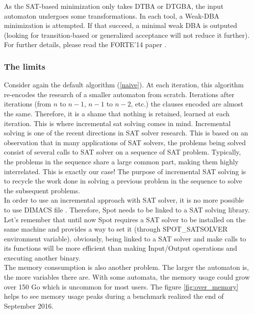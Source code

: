 \noindent As the SAT-based minimization only takes DTBA or DTGBA, the input automaton undergoes some
transformations. In each tool, a Weak-DBA minimization is attempted. If that succeed, a minimal weak DBA
is outputed (looking for transition-based or generalized acceptance will not reduce it further). For
further details, please read the FORTE'14 paper \cite{14}.

\subsubsection{The limits}
Consider again the default algorithm (\ref{naive}).
At each iteration, this algorithm re-encodes the research of a smaller automaton from scratch. Iterations
after iterations (from $n$ to $n-1$, $n-1$ to $n-2$, etc.) the clauses encoded are almost the same.
Therefore, it is a shame that nothing is retained, learned at each iteration. This is where incremental sat
solving comes in mind. Incremental solving is one of the recent directions in SAT solver research. This is
based on an observation that in many applications of SAT solvers, the problems being solved consist of
several calls to SAT solver on a sequence of SAT problem. Typically, the problems in the sequence share a
large common part, making them highly interrelated. This is exactly our case! The purpose of incremental
SAT solving is to recycle the work done in solving a previous problem in the sequence to solve the
subsequent problems.\\

In order to use an incremental approach with SAT solver, it is no more possible to use DIMACS file
\cite{18}. Therefore, Spot needs to be linked to a SAT solving library. Let's remember that until now
Spot requires a SAT solver to be installed on the same machine and provides a way to set it (through
SPOT\_SATSOLVER environment variable). obviously, being linked to a SAT solver and make calls to its
functions will be more efficient than making Input/Output operations and executing another binary.\\

The memory conssumption is also another problem. The larger the automaton is, the more variables there are.
With some automata, the memory usage could grow over 150 Go which is uncommon for most users. The figure
\ref{fig:over_memory} helps to see memory usage peaks during a benchmark realized the end of September
2016.\\

